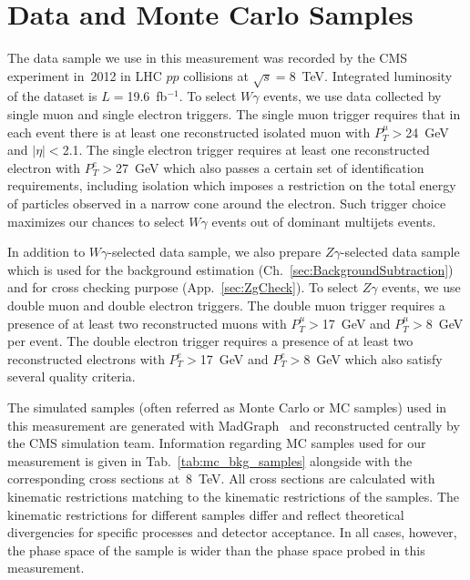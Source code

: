 \section{Data and Monte Carlo Samples}
\label{sec:DataAndMC}

The data sample we use in this measurement was recorded by the CMS experiment in~2012 in LHC $pp$ collisions at $\sqrt{s}=$8~TeV. Integrated luminosity of the dataset is $L=$19.6~fb$^{-1}$. To select $W\gamma$ events, we use data collected by single muon and single electron triggers. The single muon trigger requires that in each event there is at least one reconstructed isolated muon with $P_T^{\mu}>$24~GeV and $|\eta|<$2.1. The single electron trigger requires at least one reconstructed electron with $P_T^{e}>$27~GeV which also passes a certain set of identification requirements, including isolation which imposes a restriction on the total energy of particles observed in a narrow cone around the electron. Such trigger choice maximizes our chances to select $W\gamma$ events out of dominant multijets events.

In addition to $W\gamma$-selected data sample, we also prepare $Z\gamma$-selected data sample which is used for the background estimation (Ch.~\ref{sec:BackgroundSubtraction}) and for cross checking purpose (App.~\ref{sec:ZgCheck}). To select $Z\gamma$ events, we use double muon and double electron triggers. The double muon trigger requires a presence of at least two reconstructed muons with $P_T^{\mu}>$17~GeV and $P_T^{\mu}>$8~GeV per event. The double electron trigger requires a presence of at least two reconstructed electrons with $P_T^{e}>$17~GeV and $P_T^{e}>$8~GeV which also satisfy several quality criteria.





The simulated samples (often referred as Monte Carlo or MC samples) used in this measurement are generated with MadGraph~\cite{ref_MadGraph} and reconstructed centrally by the CMS simulation team. Information regarding MC samples used for our measurement is given in Tab.~\ref{tab:mc_bkg_samples} alongside with the corresponding cross sections at~8~TeV. All cross sections are calculated with kinematic restrictions matching to the kinematic restrictions of the samples. The kinematic restrictions for different samples differ and reflect theoretical divergencies for specific processes and detector acceptance. In all cases, however, the phase space of the sample is wider than the phase space probed in this measurement.

